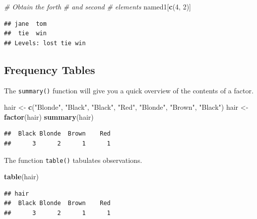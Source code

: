 \documentclass[
]{book}
\newenvironment{Shaded}{\begin{snugshade}}{\end{snugshade}}
\newcommand{\CommentTok}[1]{\textcolor[rgb]{0.56,0.35,0.01}{\textit{#1}}}
\newcommand{\DecValTok}[1]{\textcolor[rgb]{0.00,0.00,0.81}{#1}}
\newcommand{\KeywordTok}[1]{\textcolor[rgb]{0.13,0.29,0.53}{\textbf{#1}}}
\newcommand{\NormalTok}[1]{#1}
\newcommand{\StringTok}[1]{\textcolor[rgb]{0.31,0.60,0.02}{#1}}
\begin{document}
\begin{Shaded}
\begin{Highlighting}[]
\CommentTok{# Obtain the forth}
\CommentTok{# and second}
\CommentTok{# elements}
\NormalTok{named1[}\KeywordTok{c}\NormalTok{(}\DecValTok{4}\NormalTok{, }\DecValTok{2}\NormalTok{)]}
\end{Highlighting}
\end{Shaded}

\begin{verbatim}
## jane  tom 
##  tie  win 
## Levels: lost tie win
\end{verbatim}

\hypertarget{frequency-tables}{%
\subsection{Frequency Tables}\label{frequency-tables}}

The \texttt{summary()} function will give you a quick overview of the contents of a factor.

\begin{Shaded}
\begin{Highlighting}[]
\NormalTok{hair <-}\StringTok{ }\KeywordTok{c}\NormalTok{(}\StringTok{"Blonde"}\NormalTok{, }\StringTok{"Black"}\NormalTok{,}
    \StringTok{"Black"}\NormalTok{, }\StringTok{"Red"}\NormalTok{, }\StringTok{"Blonde"}\NormalTok{,}
    \StringTok{"Brown"}\NormalTok{, }\StringTok{"Black"}\NormalTok{)}
\NormalTok{hair <-}\StringTok{ }\KeywordTok{factor}\NormalTok{(hair)}
\KeywordTok{summary}\NormalTok{(hair)}
\end{Highlighting}
\end{Shaded}

\begin{verbatim}
##  Black Blonde  Brown    Red 
##      3      2      1      1
\end{verbatim}

The function \texttt{table()} tabulates observations.

\begin{Shaded}
\begin{Highlighting}[]
\KeywordTok{table}\NormalTok{(hair)}
\end{Highlighting}
\end{Shaded}

\begin{verbatim}
## hair
##  Black Blonde  Brown    Red 
##      3      2      1      1
\end{verbatim}
\end{document}
